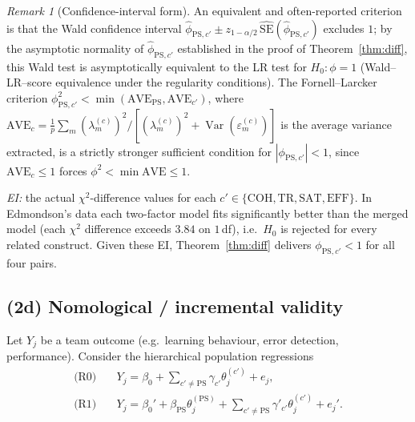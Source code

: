 \documentclass{amsart}
\theoremstyle{remark}
\newtheorem{remark}{Remark}
\begin{document}
\begin{remark}[Confidence-interval form]
An equivalent and often-reported criterion is that the Wald confidence interval
$\hat\phi_{\mathrm{PS},c'}\pm z_{1-\alpha/2}\,\widehat{\mathrm{SE}}(\hat\phi_{\mathrm{PS},c'})$
excludes $1$; by the asymptotic normality of $\hat\phi_{\mathrm{PS},c'}$ established
in the proof of Theorem~\ref{thm:diff}, this Wald test is asymptotically equivalent
to the LR test for $H_0:\phi=1$ (Wald--LR--score equivalence under the regularity
conditions). The Fornell--Larcker criterion
$\phi_{\mathrm{PS},c'}^2<\min(\mathrm{AVE}_{\mathrm{PS}},\mathrm{AVE}_{c'})$, where
$\mathrm{AVE}_c=\frac1p\sum_m(\lambda^{(c)}_m)^2/[(\lambda^{(c)}_m)^2+\operatorname{Var}(\varepsilon^{(c)}_m)]$
is the average variance extracted, is a strictly stronger sufficient condition for
$|\phi_{\mathrm{PS},c'}|<1$, since $\mathrm{AVE}_c\le1$ forces
$\phi^2<\min\mathrm{AVE}\le1$.
\end{remark}

\emph{EI:} the actual $\chi^2$-difference values for each $c'\in\{\mathrm{COH,TR,SAT,EFF}\}$.
In Edmondson's data each two-factor model fits significantly better than the merged
model (each $\chi^2$ difference exceeds $3.84$ on $1\,$df), i.e.\ $H_0$ is rejected
for every related construct. Given these EI, Theorem~\ref{thm:diff} delivers
$\phi_{\mathrm{PS},c'}<1$ for all four pairs.

\subsection{(2d) Nomological / incremental validity}\label{sec:nomo}
Let $Y_j$ be a team outcome (e.g.\ learning behaviour, error detection,
performance). Consider the hierarchical population regressions
\begin{align}
\text{(R0)}\quad & Y_j=\beta_0+\textstyle\sum_{c'\neq\mathrm{PS}}\gamma_{c'}\theta^{(c')}_j+e_j,\\
\text{(R1)}\quad & Y_j=\beta_0'+\beta_{\mathrm{PS}}\theta^{(\mathrm{PS})}_j
+\textstyle\sum_{c'\neq\mathrm{PS}}\gamma'_{c'}\theta^{(c')}_j+e_j'.
\end{align}
\end{document}
